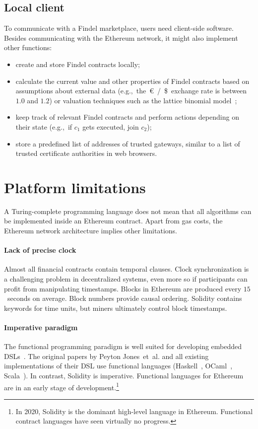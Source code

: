 \subsection{Local client}

To communicate with a Findel marketplace, users need client-side software.
Besides communicating with the Ethereum network, it might also implement other functions:
\begin{itemize}
	\item create and store Findel contracts locally;
	\item calculate the current value and other properties of Findel contracts based on assumptions about external data (e.g.,~the~\euro~/~\$~exchange rate is between $1.0$ and $1.2$) or valuation techniques such as the lattice binomial model~\cite{Cox1979};
	\item keep track of relevant Findel contracts and perform actions depending on their state (e.g.,~if \(c_1\) gets executed, join \(c_2\));
	\item store a predefined list of addresses of trusted gateways, similar to a list of trusted certificate authorities in web browsers.
\end{itemize}


\section{Platform limitations}

A Turing-complete programming language does not mean that all algorithms can be implemented inside an Ethereum contract.
Apart from gas costs, the Ethereum network architecture implies other limitations.

\paragraph{Lack of precise clock}
Almost all financial contracts contain temporal clauses.
Clock synchronization is a challenging problem in decentralized systems, even more so if participants can profit from manipulating timestamps.
Blocks in Ethereum are produced every $15$~seconds on average.
Block numbers provide causal ordering.
Solidity contains keywords for time units, but miners ultimately control block timestamps.

\paragraph{Imperative paradigm}
The functional programming paradigm is well suited for developing embedded DSLs~\cite{Gibbons2015}.
The original papers by Peyton Jones~et~al. and all existing implementations of their DSL use functional languages (Haskell~\cite{PeytonJones2000, Jones2003, Straaten2007}, OCaml~\cite{LexiFi}, Scala~\cite{Walton2012, Chaudhary2015}).
In contrast, Solidity is imperative.
Functional languages for Ethereum~\cite{FpEthereum2017} are in an early stage of development.\footnote{In 2020, Solidity is the dominant high-level language in Ethereum. Functional contract languages have seen virtually no progress.}

